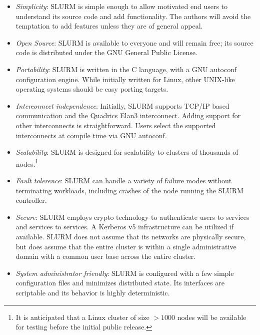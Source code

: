 \begin{itemize}
\item {\em Simplicity}: SLURM is simple enough to allow motivated end users
to understand its source code and add functionality.  The authors will 
avoid the temptation to add features unless they are of general appeal.

\item {\em Open Source}: SLURM is available to everyone and will remain free;
its source code is distributed under the GNU General Public License.

\item {\em Portability}: SLURM is written in the C language, with a GNU 
autoconf configuration engine.  While initially written for Linux, 
other UNIX-like operating systems should be easy porting targets.

\item {\em Interconnect independence}: Initially, SLURM supports TCP/IP based
communication and the Quadrics Elan3 interconnect.  Adding support for other
interconnects is straightforward.  Users select the supported interconnects
at compile time via GNU autoconf.

\item {\em Scalability}: SLURM is designed for scalability to clusters of
thousands of nodes.\footnote{It is anticipated that a Linux cluster of
size $>1000$ nodes will be available for testing before the initial public 
release.}

\item {\em Fault tolerence}: SLURM can handle a variety of failure modes
without terminating workloads, including crashes of the node running the SLURM
controller.

\item {\em Secure}: SLURM employs crypto technology to authenticate 
users to services and services to services.  
A Kerberos v5 infrastructure can be utilized if available.
SLURM does not assume that its networks are physically secure, 
but does assume that the entire cluster is within a single 
administrative domain with a common user base across the 
entire cluster.

\item {\em System administrator friendly}: SLURM is configured with a few
simple configuration files and minimizes distributed state.  Its interfaces
are scriptable and its behavior is highly deterministic.

\end{itemize}

